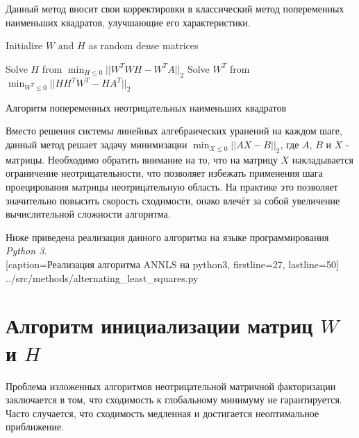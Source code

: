 Данный метод вносит свои корректировки в классический метод попеременных наименьших квадратов,
улучшающие его характеристики.


\begin{algorithm} \label{alg:als_nnls}

  \BlankLine
  \BlankLine


  \BlankLine

  Initialize $W$ and $H$ as random dense matrices\;

   {
    Solve $H$ from $\displaystyle\min_{H \leq 0}||W^TWH - W^TA||_2$\;
    Solve $W^T$ from $\displaystyle\min_{W^T \leq 0}||HH^TW^T - HA^T||_2$\;
  }

  \BlankLine

  \caption{Алгоритм попеременных неотрицательных наименьших квадратов}
\end{algorithm}

Вместо решения системы линейных алгебраических уранений на каждом шаге,
данный метод решает задачу минимизации $\displaystyle\min_{X \leq 0}||AX - B||_2$, где $A$, $B$ и $X$ - матрицы.
Необходимо обратить внимание на то, что на матрицу $X$ накладывается ограничение неотрицательности,
что позволяет избежать применения шага проецирования матрицы неотрицательную область.
На практике это позволяет значительно повысить скорость сходимости,
онако влечёт за собой увеличение вычислительной сложности алгоритма.

\newpage

Ниже приведена реализация данного алгоритма на языке программирования \textit{Python 3}.
\\


  [caption=Реализация алгоритма ANNLS на python3, firstline=27, lastline=50]
  {../src/methods/alternating_least_squares.py} \label{code:als_nnls}





\newpage





\section{Алгоритм инициализации матриц $W$ и $H$}

Проблема изложенных алгоритмов неотрицательной матричной факторизации заключается в том,
что сходимость к глобальному минимуму не гарантируется.
Часто случается, что сходимость медленная и достигается неоптимальное приближение.

